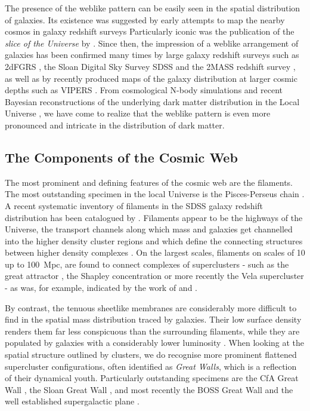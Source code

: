 The presence of the weblike pattern can be easily seen in the spatial distribution of galaxies. Its existence was  suggested 
by early attempts to map the nearby cosmos in galaxy redshift surveys \citep{Gregory1978,Geller1989,Shectman1996} 
Particularly iconic was the publication of the \emph{slice of the Universe} by \cite{Lapparent1986}. Since then, the impression 
of a weblike arrangement of galaxies has been confirmed many times by large galaxy redshift surveys such as 2dFGRS 
\citep{Colless2003,Weygaert2009}, the Sloan Digital Sky Survey SDSS \citep{Tegmark2003} and the 2MASS redshift survey \citep{Huchra2012}, 
as well as by recently produced maps of the galaxy distribution at larger cosmic depths such as VIPERS \citep{Vipers2014}. 
From cosmological N-body simulations \citep[e.g.][]{Springel2005c,Vogelsberger2014,Schaye2015} and recent Bayesian reconstructions of the 
underlying dark matter distribution in the Local Universe \citep{Hess2013,Kitaura2013}, we have 
come to realize that the weblike pattern is even more pronounced and intricate in the distribution of dark matter.

\subsection{The Components of the Cosmic Web}
The most prominent and defining features of the cosmic web are the filaments. The most outstanding specimen in the local Universe 
is the Pisces-Perseus chain \citep{Giovanelli1985}. A recent systematic inventory of filaments in the SDSS galaxy redshift 
distribution has been catalogued by \cite{Tempel2014} \cite[also see][]{Jones2010,Sousbie2011e}. Filaments appear to be the highways of the Universe, 
the transport channels along which mass and galaxies get channelled into the higher density cluster regions \citep{Haarlem1993} and 
which define the connecting structures between higher density complexes \citep{Bond1996,Colberg2005,Weygaert2009,Aragon-Calvo2010a}. On the largest 
scales, filaments on scales of 10 up to 100~Mpc, are found to connect complexes of superclusters - such as the great attractor 
\citep{1988ApJ...326...19L}, the Shapley concentration 
\citep{1930BHarO.874....9S,2006A&A...447..133P} or more recently the Vela supercluster \citep{2017MNRAS.466L..29K} - as was, for example, indicated by the work of \cite{2004ApJ...606...25B} and \cite{Libeskind2015}. 

By contrast, the tenuous sheetlike membranes are considerably more difficult to find in the spatial mass distribution traced by 
galaxies. Their low surface density renders them far less conspicuous than the surrounding filaments, while they are populated 
by galaxies with a considerably lower luminosity \citep[see e.g.][]{Cautun2014a}. When looking at the spatial structure outlined by 
clusters, we do recognise more prominent flattened supercluster configurations, often identified as \emph{Great Walls}, which 
is a reflection of their dynamical youth. Particularly outstanding specimens are the 
CfA Great Wall \citep{Geller1989}, the Sloan Great Wall \citep{2005ApJ...624..463G}, and most recently the BOSS 
Great Wall \citep{2016A&A...588L...4L} and the well established supergalactic plane \citep{1953AJ.....58...30D,2000MNRAS.312..166L}. 

